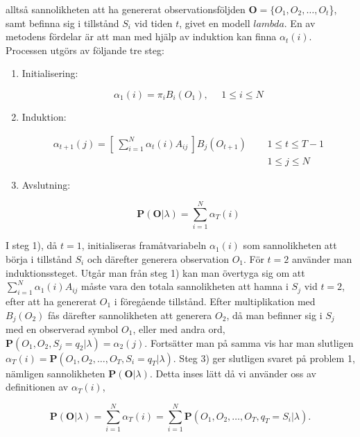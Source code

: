 \documentclass[../rapport_MVEX01-11-05]{subfiles}
\begin{document}
alltså sannolikheten att ha genererat observationsföljden $\textbf{O}
= \{O_1,O_2,\dots,O_t$\}, samt befinna sig i tillstånd $S_i$ vid tiden
$t$, givet en modell $lambda$. En av metodens fördelar är att man med
hjälp av induktion kan finna $\alpha_t(i)$. Processen utgörs av
följande tre steg: 

\begin{enumerate}
\item Initialisering:

\begin{equation*}
\alpha_1(i) = \pi_iB_i(O_1), ~~~~~~ 1\leq i \leq N
\end{equation*}

\item Induktion:

\begin{equation*}
\begin{align*}
\alpha_{t+1}(j) =
\left[~\sum_{i=1}^N\alpha_t(i)A_{ij}~\right]B_j(O_{t+1}) ~~~~~~ &1 \leq t \leq T-1 \\
&1 \leq j \leq N
\end{align*}
\end{equation*}

\item Avslutning:

\begin{equation*}
\textbf{P}(\textbf{O}|\lambda) = \sum_{i=1}^N\alpha_T(i)
\end{equation*}
\end{enumerate}

I steg 1), då $t=1$, initialiseras framåtvariabeln $\alpha_1(i)$ som
sannolikheten att börja i tillstånd $S_i$ och därefter generera
observation $O_1$. För $t=2$ använder man induktionssteget. Utgår man
från steg 1) kan man övertyga sig om att
$\sum_{i=1}^N\alpha_1(i)A_{ij}$ måste vara den totala sannolikheten
att hamna i $S_j$ vid $t=2$, efter att ha genererat $O_1$ i föregående
tillstånd. Efter multiplikation med $B_j(O_{2})$ fås därefter
sannolikheten att generera $O_2$, då man befinner sig i $S_j$ med en
observerad symbol $O_1$, eller med andra ord, $\textbf{P}(O_1,O_2,S_j
= q_2 | \lambda) = \alpha_2(j)$. Fortsätter man på samma vis har man
slutligen $\alpha_T(i) = \textbf{P}(O_1,O_2,\dots,O_T,S_i = q_T |
\lambda)$. Steg 3) ger slutligen svaret på problem 1, nämligen
sannolikheten $\textbf{P}(\textbf{O}|\lambda)$. Detta inses lätt då vi
använder oss av definitionen av $\alpha_T(i)$, 

\begin{equation*}
\textbf{P}(\textbf{O}|\lambda) = \sum_{i=1}^N\alpha_T(i) =
\sum_{i=1}^N\textbf{P}(O_1,O_2,\dots,O_T,q_T = S_i|\lambda). 
\end{equation*} 
\end{document}

